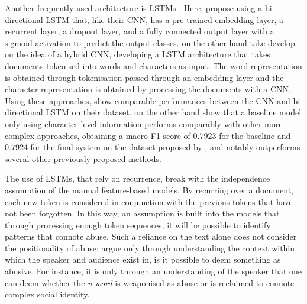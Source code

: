 Another frequently used architecture is LSTMs \citep{Badjatiya:2017,Kolhatkar:2021,Meyer:2019}. Here, \citet{Kolhatkar:2021} propose using a bi-directional LSTM that, like their CNN, has a pre-trained embedding layer, a recurrent layer, a dropout layer, and a fully connected output layer with a sigmoid activation to predict the output classes. \citet{Meyer:2019} on the other hand take develop on the idea of a hybrid CNN, developing a LSTM architecture that takes documents tokenised into words and characters as input. The word representation is obtained through tokenisation passed through an embedding layer and the character representation is obtained by processing the documents with a CNN.
Using these approaches, \citet{Kolhatkar:2021} show comparable performances between the CNN and bi-directional LSTM on their dataset. \citet{Meyer:2019} on the other hand show that a baseline model only using character level information performs comparably with other more complex approaches, obtaining a macro F1-score of $0.7923$ for the baseline and $0.7924$ for the final system on the dataset proposed by \citet{Waseem-Hovy:2016}, and notably outperforms several other previously proposed methods.

The use of LSTMs, that rely on recurrence, break with the independence assumption of the manual feature-based models. By recurring over a document, each new token is considered in conjunction with the previous tokens that have not been forgotten. In this way, an assumption is built into the models that through processing enough token sequences, it will be possible to identify patterns that connote abuse. Such a reliance on the text alone does not consider the positionality of abuse; \citet{Waseem:2018} argue only through understanding the context within which the speaker and audience exist in, is it possible to deem something as abusive. For instance, it is only through an understanding of the speaker that one can deem whether the \textit{n-word} is weaponised as abuse or is reclaimed to connote complex social identity.\vspace{5mm}

